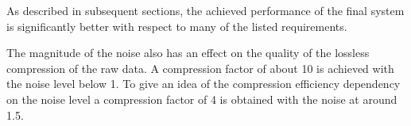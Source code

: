 As described %
in subsequent sections, the achieved performance of the final system is significantly better with respect to many of the listed requirements.  %

The magnitude of the noise also %
has an effect on the quality of the lossless compression of the raw data. %
A compression factor of about \num{10} is achieved with the \rms noise level below \SI{1}{}. To give an idea of the compression efficiency dependency on the noise level a compression factor of \num{4} is obtained with the noise at around \SI{1.5}{}. 




